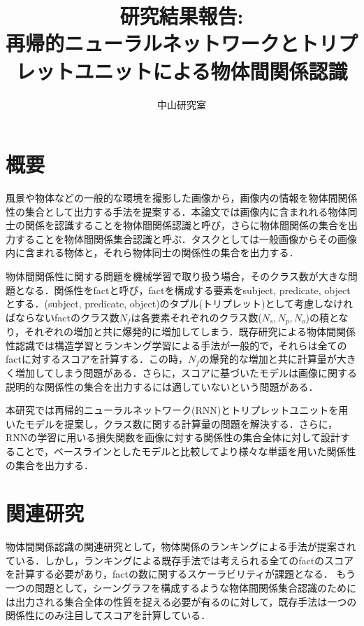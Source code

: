 

\title{研究結果報告:\\
再帰的ニューラルネットワークとトリプレットユニットによる物体間関係認識}
\author{中山研究室}

\maketitle



\section{概要}
風景や物体などの一般的な環境を撮影した画像から，画像内の情報を物体間関係性の集合として出力する手法を提案する．本論文では画像内に含まれれる物体同士の関係を認識することを物体間関係認識と呼び，さらに物体間関係の集合を出力することを物体間関係集合認識と呼ぶ．タスクとしては一般画像からその画像内に含まれる物体と，それら物体同士の関係性の集合を出力する．

物体間関係性に関する問題を機械学習で取り扱う場合，そのクラス数が大きな問題となる．関係性をfactと呼び，factを構成する要素をsubject, predicate, objectとする．(subject, predicate, object)のタプル(トリプレット)として考慮しなければならないfactのクラス数$N_f$は各要素それぞれのクラス数($N_s,N_p,N_o$)の積となり，それぞれの増加と共に爆発的に増加してしまう．既存研究による物体間関係性認識では構造学習とランキング学習による手法が一般的で，それらは全てのfactに対するスコアを計算する．この時，$N_f$の爆発的な増加と共に計算量が大きく増加してしまう問題がある．さらに，スコアに基づいたモデルは画像に関する説明的な関係性の集合を出力するには適していないという問題がある．

本研究では再帰的ニューラルネットワーク(RNN)とトリプレットユニットを用いたモデルを提案し，クラス数に関する計算量の問題を解決する．さらに，RNNの学習に用いる損失関数を画像に対する関係性の集合全体に対して設計することで，ベースラインとしたモデルと比較してより様々な単語を用いた関係性の集合を出力する．

\section{関連研究}
物体間関係認識の関連研究として，物体関係のランキングによる手法\cite{Sadeghi2011,CewuLuRanjayKrishnaMichaelBernstein,Atzmon2016}が提案されている．しかし，ランキングによる既存手法では考えられる全てのfactのスコアを計算する必要があり，factの数に関するスケーラビリティが課題となる．
もう一つの問題として，シーングラフを構成するような物体間関係集合認識のためには出力される集合全体の性質を捉える必要が有るのに対して，既存手法は一つの関係性にのみ注目してスコアを計算している．

